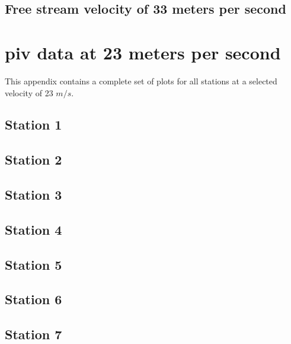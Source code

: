 \section{Free stream velocity of 33 meters per second}

\newpage


\chapter{piv data at 23 meters per second}
\label{appendix:23mps}

This appendix contains a complete set of plots for all stations at a selected 
velocity of 23 $m/s$.

\section{Station 1}

\newpage
\section{Station 2}

\newpage
\section{Station 3}

\newpage
\section{Station 4}

\newpage
\section{Station 5}

\newpage
\section{Station 6}

\newpage
\section{Station 7}
